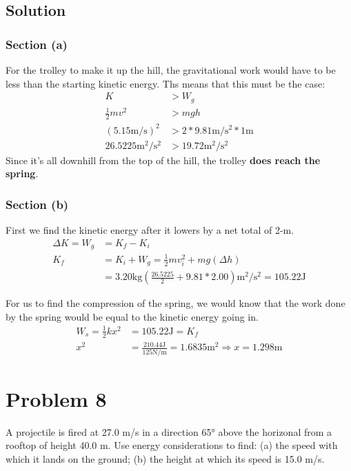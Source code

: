 \documentclass[12pt]{article}
\begin{document}
\subsection*{Solution}
\subsubsection*{Section (a)}
For the trolley to make it up the hill, the gravitational work would have to be less than the starting kinetic energy. Ths means that this must be the case: 
\begin{align*}
    K &> W_g \\ 
    \frac{1}{2}mv^2 &> mgh \\ 
    (5.15\unit{\meter/\second})^2 &> 2*9.81\unit{\meter/\second^2}*1\unit{\meter} \\
    26.5225\unit{\meter^2/\second^2} &> 19.72\unit{\meter^2/\second^2}
\end{align*}
Since it's all downhill from the top of the hill, the trolley \textbf{does reach the spring}.

\subsubsection*{Section (b)}
First we find the kinetic energy after it lowers by a net total of 2-m. 
\begin{align*}
    \Delta K = W_g &= K_f - K_i\\
    K_f &=  K_i + W_g
        =   \frac{1}{2}mv_i^2 + mg(\Delta h)\\
        &=  3.20\unit{\kilo\gram}(\frac{26.5225}{2} + 9.81*2.00)\unit{\meter^2/\second^2} = 105.22\unit{\joule}
\end{align*}

For us to find the compression of the spring, we would know that the work done by the spring would be equal to the kinetic energy going in.
\begin{align*}
    W_s = \frac{1}{2}kx^2 &= 105.22\unit{\joule} = K_f\\
    x^2 &= \frac{210.44\unit{\joule}}{125\unit{\newton/\meter}} = 1.6835\unit{\meter^2} \Rightarrow x = \boxed{1.298\unit{\meter}}
\end{align*}

\pagebreak
\section*{Problem 8}
A projectile is fired at 27.0 m/s in a direction 65\unit{\degree} above the horizonal from a rooftop of height 40.0 m. Use energy considerations to find: (a) the speed with which it lands on the ground; (b) the height at which its speed is 15.0 m/s.
\end{document}
